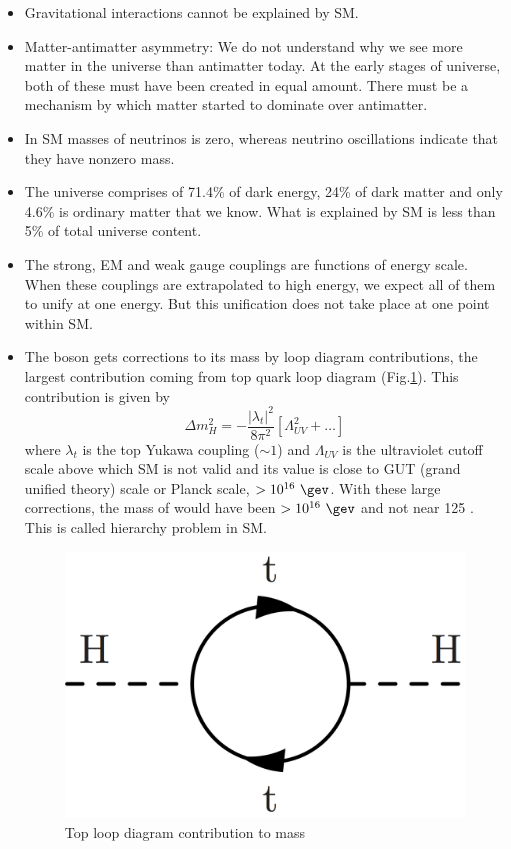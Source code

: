 \begin{itemize}
\item Gravitational interactions cannot be explained by SM.
\item Matter-antimatter asymmetry: We do not understand why we see more matter in the universe than antimatter today. At the early stages of universe, both of these must have been created in equal amount. There must be a mechanism by which matter started to dominate over antimatter.
\item In SM masses of neutrinos is zero, whereas neutrino oscillations indicate that they have nonzero mass.
\item The universe comprises of 71.4\% of dark energy, 24\% of dark matter and only 4.6\% is ordinary matter that we know. What is explained by SM is less than 5\% of total universe content.
\item The strong, EM and weak gauge couplings are functions of energy scale. When these couplings are extrapolated to high energy, we expect all of them to unify at one energy. But this unification does not take place at one point within SM.
\item The \higgs boson gets corrections to its mass by loop diagram contributions, the largest contribution coming from top quark loop diagram (Fig.\ref{fig:hierarchy_problem_higgs}). This contribution is given by
\begin{equation}
\Delta m_{H}^2 = -\frac{|\lambda_t|^2}{8\pi^2}[\Lambda_{UV}^2 + \dots]
\label{eqn:HmassCorr}
\end{equation}
where $\lambda_t$ is the top Yukawa coupling ($\sim 1$) and $\Lambda_{UV}$ is the ultraviolet cutoff scale above which SM is not valid and its value is close to GUT (grand unified theory) scale or Planck scale, $> 10^{16}\ \gev$. With these large corrections, the mass of \higgs would have been $> 10^{16}\ \gev$ and not near 125 \gev. This is called hierarchy problem in SM.
\begin{figure}[h!]
\centering
\includegraphics[width=0.35\linewidth]{../Figures/hierarchy_problem_higgs.png}
\caption{Top loop diagram contribution to \higgs mass}
\label{fig:hierarchy_problem_higgs}
\end{figure}
\end{itemize}

